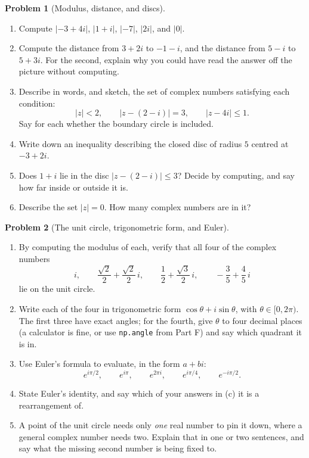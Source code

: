 \documentclass[11pt]{article}
\theoremstyle{definition}
\newtheorem{prob}{Problem}[section]
\begin{document}
\begin{prob}[Modulus, distance, and discs]
\begin{enumerate}[label=\textbf{(\alph*)},leftmargin=2.6em,itemsep=7pt,topsep=6pt]
  \item Compute $\lvert -3+4i\rvert$, $\lvert 1+i\rvert$, $\lvert -7\rvert$,
        $\lvert 2i\rvert$, and $\lvert 0\rvert$.
  \item Compute the distance from $3+2i$ to $-1-i$, and the distance from
        $5-i$ to $5+3i$. For the second, explain why you could have read the
        answer off the picture without computing.
  \item Describe in words, and sketch, the set of complex numbers satisfying
        each condition:
        \[
          \lvert z\rvert < 2,
          \qquad
          \lvert z - (2-i)\rvert = 3,
          \qquad
          \lvert z - 4i\rvert \le 1 .
        \]
        Say for each whether the boundary circle is included.
  \item Write down an inequality describing the closed disc of radius $5$
        centred at $-3+2i$.
  \item Does $1+i$ lie in the disc $\lvert z-(2-i)\rvert\le 3$? Decide by
        computing, and say how far inside or outside it is.
  \item Describe the set $\lvert z\rvert = 0$. How many complex numbers are in
        it?
\end{enumerate}
\end{prob}

\begin{prob}[The unit circle, trigonometric form, and Euler]
\begin{enumerate}[label=\textbf{(\alph*)},leftmargin=2.6em,itemsep=7pt,topsep=6pt]
  \item By computing the modulus of each, verify that all four of the complex
        numbers
        \[
          i,
          \qquad
          \frac{\sqrt2}{2}+\frac{\sqrt2}{2}\,i,
          \qquad
          \frac12+\frac{\sqrt3}{2}\,i,
          \qquad
          -\frac35+\frac45\,i
        \]
        lie on the unit circle.
  \item Write each of the four in trigonometric form $\cos\theta+i\sin\theta$,
        with $\theta\in[0,2\pi)$. The first three have exact angles; for the
        fourth, give $\theta$ to four decimal places (a calculator is fine, or
        use \texttt{np.angle} from Part F) and say which quadrant it is in.
  \item Use Euler's formula to evaluate, in the form $a+bi$:
        \[
          e^{i\pi/2},\qquad
          e^{i\pi},\qquad
          e^{2\pi i},\qquad
          e^{i\pi/4},\qquad
          e^{-i\pi/2}.
        \]
  \item State Euler's identity, and say which of your answers in (c) it is a
        rearrangement of.
  \item A point of the unit circle needs only \emph{one} real number to pin it
        down, where a general complex number needs two. Explain that in one or
        two sentences, and say what the missing second number is being fixed to.
\end{enumerate}
\end{prob}
\end{document}
